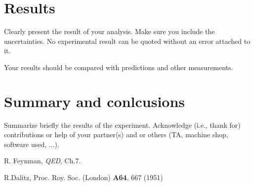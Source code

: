 \documentclass[10pt,letterpaper,onecolumn]{article}
\begin{document}

\section{Results}

Clearly present the result of your analysis. Make sure
you include the uncertainties. No experimental result
can be quoted without an error attached to it.

Your results should be compared with predictions and other
measurements.



\section{Summary and conlcusions}

Summarize briefly the results of the experiment.
Acknowledge (i.e., thank for) contributions or help
of your partner(s) and or
others (TA, machine shop, software used, ...).


\begin{thebibliography}{9}

 R. Feynman, {\it QED}, Ch.7.

R.Dalitz, Proc. Roy. Soc. (London) {\bf A64}, 667 (1951)

\end{thebibliography}

\end{document}
